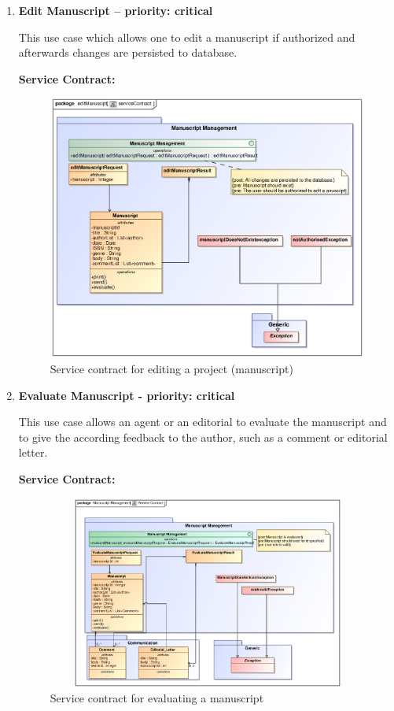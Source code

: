 \begin{enumerate}
\newpage

\item \textbf{Edit Manuscript – priority: critical}
\par{This use case which allows one to edit a manuscript if authorized and afterwards changes are persisted to database.}

\textbf{Service Contract:}

\begin{figure}[h]
\includegraphics[height=330px, width=500px]{epsImages/ManuscriptManagement/editManuscript.eps}
\caption{Service contract for editing a  project (manuscript)}
\end{figure}
\newpage

\item \textbf{Evaluate Manuscript - priority: critical}
\par{This use case allows an agent or an editorial to evaluate the manuscript and to give the according feedback to the author, such as a comment or editorial letter.}

\textbf{Service Contract:}

\begin{figure}[h]
\includegraphics[height=240px, width=500px]{epsImages/ManuscriptManagement/EvaluateManuscript.eps}
\caption{Service contract for evaluating a manuscript}
\end{figure}


\end{enumerate}

